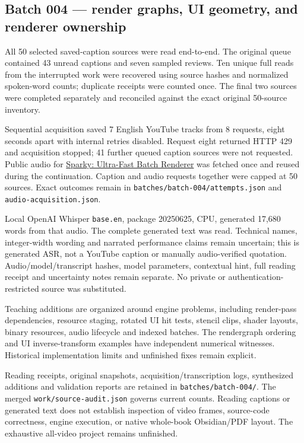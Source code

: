 \subsection{Batch 004 --- render graphs, UI geometry, and renderer ownership}\label{batch-004-render-graphs-ui-geometry-and-renderer-ownership}

All 50 selected saved-caption sources were read end-to-end. The original queue contained 43 unread captions and seven sampled reviews. Ten unique full reads from the interrupted work were recovered using source hashes and normalized spoken-word counts; duplicate receipts were counted once. The final two sources were completed separately and reconciled against the exact original 50-source inventory.

Sequential acquisition saved 7 English YouTube tracks from 8 requests, eight seconds apart with internal retries disabled. Request eight returned HTTP 429 and acquisition stopped; 41 further queued caption sources were not requested. Public audio for \href{https://www.youtube.com/watch?v=ImtWD_9OAeY}{Sparky: Ultra-Fast Batch Renderer} was fetched once and reused during the continuation. Caption and audio requests together were capped at 50 sources. Exact outcomes remain in \texttt{batches/batch-004/attempts.json} and \texttt{audio-acquisition.json}.

Local OpenAI Whisper \texttt{base.en}, package 20250625, CPU, generated 17,680 words from that audio. The complete generated text was read. Technical names, integer-width wording and narrated performance claims remain uncertain; this is generated ASR, not a YouTube caption or manually audio-verified quotation. Audio/model/transcript hashes, model parameters, contextual hint, full reading receipt and uncertainty notes remain separate. No private or authentication-restricted source was substituted.

Teaching additions are organized around engine problems, including render-pass dependencies, resource staging, rotated UI hit tests, stencil clips, shader layouts, binary resources, audio lifecycle and indexed batches. The rendergraph ordering and UI inverse-transform examples have independent numerical witnesses. Historical implementation limits and unfinished fixes remain explicit.

Reading receipts, original snapshots, acquisition/transcription logs, synthesized additions and validation reports are retained in \texttt{batches/batch-004/}. The merged \texttt{work/source-audit.json} governs current counts. Reading captions or generated text does not establish inspection of video frames, source-code correctness, engine execution, or native whole-book Obsidian/PDF layout. The exhaustive all-video project remains unfinished.

